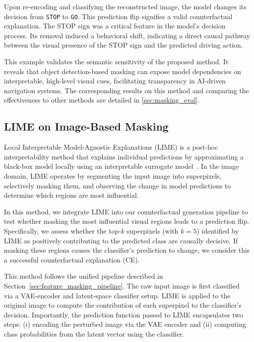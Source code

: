 Upon re-encoding and classifying the reconstructed image, the model changes its decision from \texttt{STOP} to \texttt{GO}. This prediction flip signifies a valid counterfactual explanation. The STOP sign was a critical feature in the model’s decision process. Its removal induced a behavioral shift, indicating a direct causal pathway between the visual presence of the STOP sign and the predicted driving action.

This example validates the semantic sensitivity of the proposed method. It reveals that object detection-based masking can expose model dependencies on interpretable, high-level visual cues, facilitating transparency in AI-driven navigation systems. The corresponding results on this method and comparing the effectiveness to other methods are detailed in \cref{sec:masking_eval}.





\subsection{LIME on Image-Based Masking}
\label{sec:lime_on_images}

Local Interpretable Model-Agnostic Explanations (LIME) is a post-hoc interpretability method that explains individual predictions by approximating a black-box model locally using an interpretable surrogate model~\cite{Ribeiro2018}. In the image domain, LIME operates by segmenting the input image into superpixels, selectively masking them, and observing the change in model predictions to determine which regions are most influential.

In this method, we integrate LIME into our counterfactual generation pipeline to test whether masking the most influential visual regions leads to a prediction flip. Specifically, we assess whether the top-$k$ superpixels (with $k=5$) identified by LIME as positively contributing to the predicted class are causally decisive. If masking these regions causes the classifier’s prediction to change, we consider this a successful counterfactual explanation (CE).

This method follows the unified pipeline described in Section~\ref{sec:feature_masking_pipeline}. The raw input image is first classified via a VAE-encoder and latent-space classifier setup. LIME is applied to the original image to compute the contribution of each superpixel to the classifier’s decision. Importantly, the prediction function passed to LIME encapsulates two steps: (i) encoding the perturbed image via the VAE encoder and (ii) computing class probabilities from the latent vector using the classifier.

